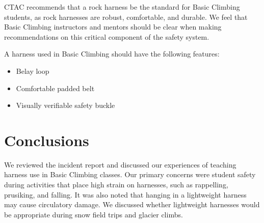 \documentclass[nonacm,acmtog]{acmart}
\begin{document}
  CTAC recommends that a rock harness be the standard for
  Basic Climbing students, as rock harnesses are robust, comfortable, and
  durable. We feel that Basic Climbing instructors and mentors should be clear
  when making recommendations on this critical component of the safety system.

  A harness used in Basic Climbing should have the following features:
  \begin{itemize}
  \item Belay loop
  \item Comfortable padded belt
  \item Visually verifiable safety buckle
  \end{itemize}



\section{Conclusions}
\label{sec:conclusions}

  We reviewed the incident report and discussed our experiences of teaching
  harness use in Basic Climbing classes.  Our primary concerns were student
  safety during activities that place high strain on harnesses, such as
  rappelling, prusiking, and falling.  It was also noted that hanging in a
  lightweight harness may cause circulatory damage. We discussed whether
  lightweight harnesses would be appropriate during snow field trips and
  glacier climbs.



\nocite{bmc:harness,mec:harness,rei:harness,rockandice:harness,en:harness,uiaa:harness,astm:harness}



\end{document}
